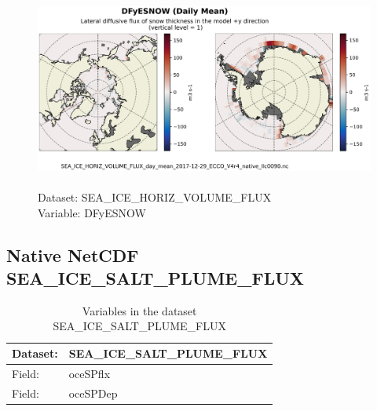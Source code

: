\begin{figure}[H]
\centering
\includegraphics[scale=0.5]{../images/plots/native_plots/Sea-Ice_and_Snow_Horizontal_Volume_Fluxes/DFyESNOW.png}
\caption{\\Dataset: SEA\_ICE\_HORIZ\_VOLUME\_FLUX\\Variable: DFyESNOW}
\label{tab:table-SEA_ICE_HORIZ_VOLUME_FLUX_DFyESNOW-Plot}
\end{figure}
\pagebreak
\subsection{Native NetCDF SEA\_ICE\_SALT\_PLUME\_FLUX}
\newp
\begin{longtable}{|p{}|p{}|}
\caption{Variables in the dataset SEA\_ICE\_SALT\_PLUME\_FLUX}
\label{tab:table-SEA_ICE_SALT_PLUME_FLUX-fields} \\ 
\hline \endhead \hline \endfoot
\rowcolor{lightgray} \textbf{Dataset:} & \textbf{SEA\_ICE\_SALT\_PLUME\_FLUX} \\ \hline
Field: &oceSPflx \\ \hline
Field: &oceSPDep \\ \hline
\end{longtable}

\pagebreak
